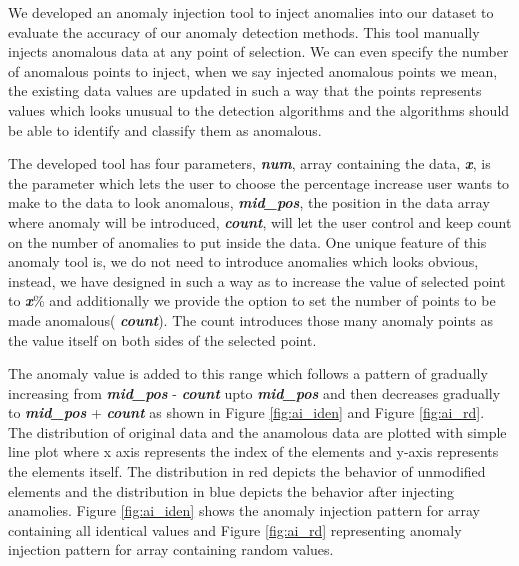We developed an anomaly injection tool to inject anomalies into our dataset to evaluate the accuracy of our anomaly detection methods. This tool manually injects anomalous data at any point of selection. We can even specify the number of anomalous points to inject, when we say injected anomalous points we mean, the existing data values are updated in such a way that the points represents values which looks unusual to the detection algorithms and the algorithms should be able to identify and classify them as anomalous. 

The developed tool has four parameters, \textbf{\textit{num}}, array containing the data, \textbf{\textit{x}}, is the parameter which lets the user to choose the percentage increase user wants to make to the data to look anomalous, \textbf{\textit{mid\_pos}}, the position in the data array where anomaly will be introduced, \textbf{\textit{count}}, will let the user control and keep count on the number of anomalies to put inside the data. One unique feature of this anomaly tool is, we do not need to introduce anomalies which looks obvious, instead, we have designed in such a way as to increase the value of selected point to  \textbf{\textit{x}}\% and additionally we provide the option to set the number of points to be made anomalous( \textbf{\textit{count}}). The count introduces those many anomaly points as the value itself on both sides of the selected point. 

The anomaly value is added to this range which follows a pattern of gradually increasing  from \textbf{\textit{mid\_pos}} - \textbf{\textit{count}} upto \textbf{\textit{mid\_pos}}  and then decreases gradually to   \textbf{\textit{mid\_pos}} + \textbf{\textit{count}} as shown in Figure \ref{fig:ai_iden} and  Figure \ref{fig:ai_rd}.  The distribution of original data and the anamolous data are plotted with simple line plot where x axis represents the index of the elements and y-axis represents the elements itself. The distribution in red depicts the behavior of unmodified elements and the distribution in blue depicts the behavior after injecting anamolies. Figure \ref{fig:ai_iden} shows the anomaly injection pattern for array containing all identical values and Figure \ref{fig:ai_rd} representing anomaly injection pattern for array containing random values. 

